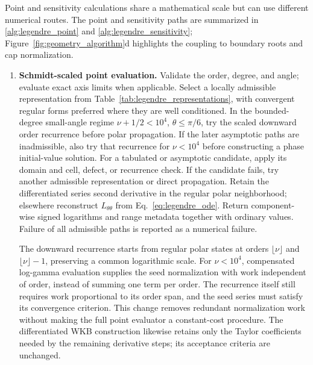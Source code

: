 ﻿\documentclass[11pt,a4paper]{article}
\begin{document}
Point and sensitivity calculations share a mathematical scale but can use different numerical routes. The point and sensitivity paths are summarized in \ref{alg:legendre_point} and \ref{alg:legendre_sensitivity}; Figure~\ref{fig:geometry_algorithm}d highlights the coupling to boundary roots and cap normalization.

\begin{enumerate}[label=\textbf{Algorithm 1.},leftmargin=2.5cm,ref=Algorithm 1]
\item\label{alg:legendre_point}\textbf{Schmidt-scaled point evaluation.}
Validate the order, degree, and angle; evaluate exact axis limits when applicable. Select a locally admissible representation from Table~\ref{tab:legendre_representations}, with convergent regular forms preferred where they are well conditioned. In the bounded-degree small-angle regime $\nu+1/2<10^4$, $\theta\leq\pi/6$, try the scaled downward order recurrence before polar propagation. If the later asymptotic paths are inadmissible, also try that recurrence for $\nu<10^4$ before constructing a phase initial-value solution. For a tabulated or asymptotic candidate, apply its domain and cell, defect, or recurrence check. If the candidate fails, try another admissible representation or direct propagation. Retain the differentiated series second derivative in the regular polar neighborhood; elsewhere reconstruct $L_{\theta\theta}$ from Eq.~\eqref{eq:legendre_ode}. Return component-wise signed logarithms and range metadata together with ordinary values. Failure of all admissible paths is reported as a numerical failure.

The downward recurrence starts from regular polar states at orders $\lfloor\nu\rfloor$ and $\lfloor\nu\rfloor-1$, preserving a common logarithmic scale. For $\nu<10^4$, compensated log-gamma evaluation supplies the seed normalization with work independent of order, instead of summing one term per order. The recurrence itself still requires work proportional to its order span, and the seed series must satisfy its convergence criterion. This change removes redundant normalization work without making the full point evaluator a constant-cost procedure. The differentiated WKB construction likewise retains only the Taylor coefficients needed by the remaining derivative steps; its acceptance criteria are unchanged.
\end{enumerate}
\end{document}
